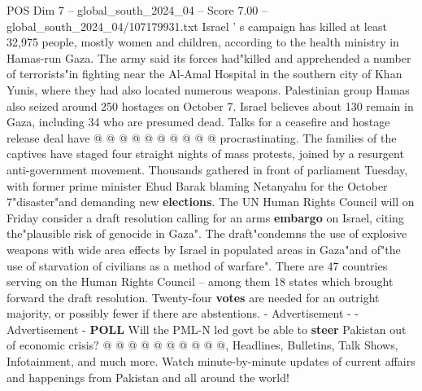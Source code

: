 \begin{textsample}{POS Dim 7 – global\_south\_2024\_04 – Score 7.00 – global\_south\_2024\_04/107179931.txt}
Israel ' s campaign has killed at least 32,975 people, mostly women and children, according to the health ministry in Hamas-run Gaza.
The army said its forces had"killed and apprehended a number of terrorists"in fighting near the Al-Amal Hospital in the southern city of Khan Yunis, where they had also located numerous weapons.
Palestinian group Hamas also seized around 250 hostages on October 7.
Israel believes about 130 remain in Gaza, including 34 who are presumed dead.
Talks for a ceasefire and hostage release deal have @ @ @ @ @ @ @ @ @ @ procrastinating.
The families of the captives have staged four straight nights of mass protests, joined by a resurgent anti-government movement.
Thousands gathered in front of parliament Tuesday, with former prime minister Ehud Barak blaming Netanyahu for the October 7"disaster"and demanding new \textbf{elections}.
The UN Human Rights Council will on Friday consider a draft resolution calling for an arms \textbf{embargo} on Israel, citing the"plausible risk of genocide in Gaza".
The draft"condemns the use of explosive weapons with wide area effects by Israel in populated areas in Gaza"and of"the use of starvation of civilians as a method of warfare".
There are 47 countries serving on the Human Rights Council -- among them 18 states which brought forward the draft resolution.
Twenty-four \textbf{votes} are needed for an outright majority, or possibly fewer if there are abstentions. - Advertisement - - Advertisement - \textbf{POLL} Will the PML-N led govt be able to \textbf{steer} Pakistan out of economic crisis? @ @ @ @ @ @ @ @ @ @, Headlines, Bulletins, Talk Shows, Infotainment, and much more.
Watch minute-by-minute updates of current affairs and happenings from Pakistan and all around the world!

\end{textsample}
